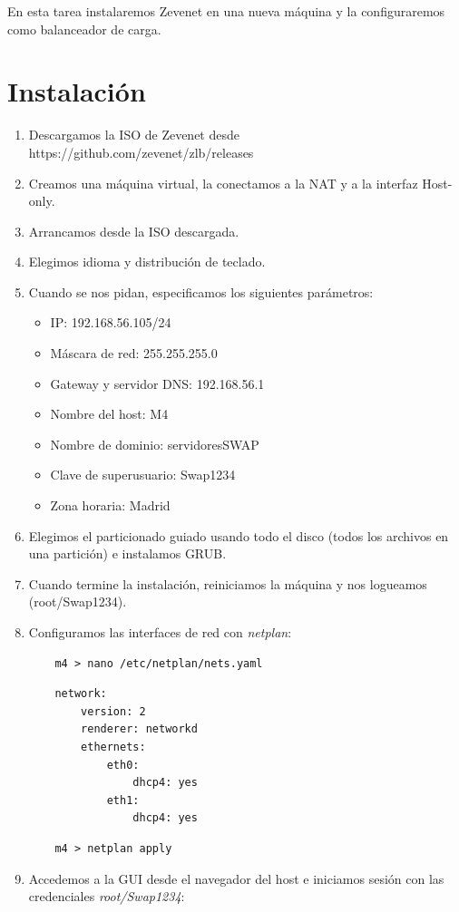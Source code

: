 \documentclass[12pt,spanish]{article}
\begin{document}
En esta tarea instalaremos Zevenet en una nueva máquina y la configuraremos como balanceador de carga.

\section{Instalación}
\begin{enumerate}
	\item Descargamos la ISO de Zevenet desde https://github.com/zevenet/zlb/releases
	\item Creamos una máquina virtual, la conectamos a la NAT y a la interfaz Host-only.
	\item Arrancamos desde la ISO descargada.
	\item Elegimos idioma y distribución de teclado.
	\item Cuando se nos pidan, especificamos los siguientes parámetros:
	\begin{itemize}
		\item IP: 192.168.56.105/24
		\item Máscara de red: 255.255.255.0
		\item Gateway y servidor DNS: 192.168.56.1
		\item Nombre del host: M4
		\item Nombre de dominio: servidoresSWAP
		\item Clave de superusuario: Swap1234
		\item Zona horaria: Madrid
	\end{itemize}
	\item Elegimos el particionado guiado usando todo el disco (todos los archivos en una partición) e instalamos GRUB.
	\item Cuando termine la instalación, reiniciamos la máquina y nos logueamos (root/Swap1234).
	\item Configuramos las interfaces de red con \emph{netplan}:
	\begin{lstlisting}
	m4 > nano /etc/netplan/nets.yaml
	\end{lstlisting}
	\begin{lstlisting}
	network:
		version: 2
		renderer: networkd
		ethernets:
			eth0:
				dhcp4: yes
			eth1:
				dhcp4: yes
	\end{lstlisting}
	\begin{lstlisting}
	m4 > netplan apply
	\end{lstlisting}
	\item Accedemos a la GUI desde el navegador del host e iniciamos sesión con las credenciales \emph{root/Swap1234}:

\end{enumerate}
\end{document}
